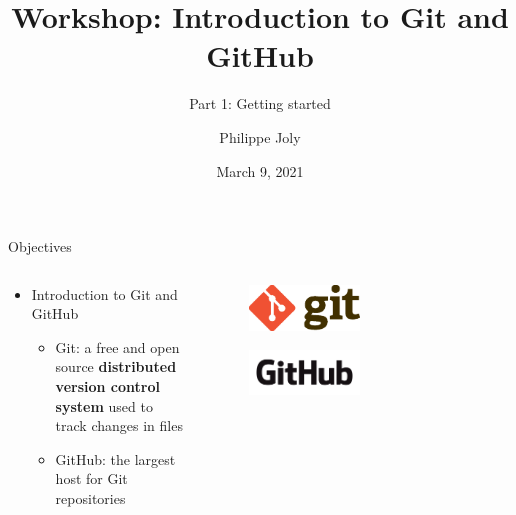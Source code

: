 \documentclass[handout]{beamer}
\title{Workshop: Introduction to Git and GitHub}
\subtitle{Part 1: Getting started}
\author[PJ]{Philippe Joly}
\institute[FU-Berlin]{Freie Universität Berlin}
\date{March 9, 2021}
\begin{document}
\begin{frame}
\titlepage
\end{frame}


\begin{frame}{Objectives}
  \begin{columns}
  
    \begin{column}{0.5\textwidth}
    	\begin{itemize}
			  \item Introduction to Git and GitHub
			  \begin{itemize}
				  \item Git: a free and open source \textbf{distributed version control system} used to track changes in files
				  \item GitHub: the largest host for Git repositories
			  \end{itemize}
		  \end{itemize}
		\end{column}
		
    \begin{column}{0.5\textwidth}
      \begin{figure}
	      \includegraphics[width=0.5\textwidth]{figures/git_logo.eps}
	      \caption{}
      \end{figure}
      \begin{figure}
	      \includegraphics[width=0.5\textwidth]{figures/github_logo.png}
	      \caption{}
      \end{figure}
    \end{column}
  \end{columns}
\end{frame}
\end{document}

